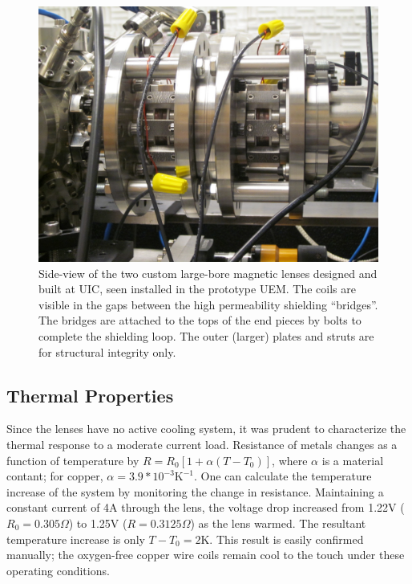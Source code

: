 \begin{figure}
  \centering
  \includegraphics{maglens.jpg}
  \caption[Side-view picture of the employed two custom large-bore magnetic lenses]{
    Side-view of the two custom large-bore magnetic lenses designed and built at UIC, seen installed in the prototype UEM.
    The coils are visible in the gaps between the high permeability shielding ``bridges''.
    The bridges are attached to the tops of the end pieces by bolts to complete the shielding loop.
    The outer (larger) plates and struts are for structural integrity only.
  }
  \label{fig:maglens-pic}
\end{figure}

\subsection{Thermal Properties} \label{sec:mag_lens_thermal}

Since the lenses have no active cooling system, it was prudent to characterize the thermal response to a moderate current load.
Resistance of metals changes as a function of temperature by $ R = R_0 [ 1 + \alpha ( T - T_0 ) ] $, where $\alpha$ is a material contant; for copper, $\alpha = 3.9 * 10^{-3} \text{K}^{-1}$. 
One can calculate the temperature increase of the system by monitoring the change in resistance.
Maintaining a constant current of 4A through the lens, the voltage drop increased from 1.22V ($R_0 = 0.305\Omega$) to 1.25V ($R=0.3125\Omega$) as the lens warmed.
The resultant temperature increase is only $T - T_0 = 2\text{K}$.
This result is easily confirmed manually; the oxygen-free copper wire coils remain cool to the touch under these operating conditions.

